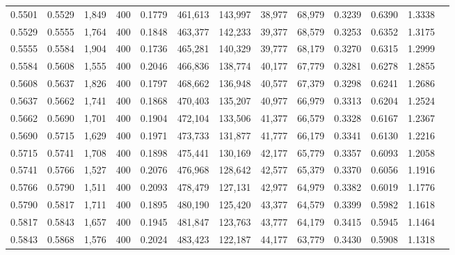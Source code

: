 \begin{tabular}{rrrrrrrrrrrrr}
0.5501 & 0.5529 &  1,849 &   400 &                                     0.1779 & 461,613 & 143,997 &  38,977 &  68,979 & 0.3239 & 0.6390 & 1.3338 \\
0.5529 & 0.5555 &  1,764 &   400 &                                     0.1848 & 463,377 & 142,233 &  39,377 &  68,579 & 0.3253 & 0.6352 & 1.3175 \\
0.5555 & 0.5584 &  1,904 &   400 &                                     0.1736 & 465,281 & 140,329 &  39,777 &  68,179 & 0.3270 & 0.6315 & 1.2999 \\
0.5584 & 0.5608 &  1,555 &   400 &                                     0.2046 & 466,836 & 138,774 &  40,177 &  67,779 & 0.3281 & 0.6278 & 1.2855 \\
0.5608 & 0.5637 &  1,826 &   400 &                                     0.1797 & 468,662 & 136,948 &  40,577 &  67,379 & 0.3298 & 0.6241 & 1.2686 \\
0.5637 & 0.5662 &  1,741 &   400 &                                     0.1868 & 470,403 & 135,207 &  40,977 &  66,979 & 0.3313 & 0.6204 & 1.2524 \\
0.5662 & 0.5690 &  1,701 &   400 &                                     0.1904 & 472,104 & 133,506 &  41,377 &  66,579 & 0.3328 & 0.6167 & 1.2367 \\
0.5690 & 0.5715 &  1,629 &   400 &                                     0.1971 & 473,733 & 131,877 &  41,777 &  66,179 & 0.3341 & 0.6130 & 1.2216 \\
0.5715 & 0.5741 &  1,708 &   400 &                                     0.1898 & 475,441 & 130,169 &  42,177 &  65,779 & 0.3357 & 0.6093 & 1.2058 \\
0.5741 & 0.5766 &  1,527 &   400 &                                     0.2076 & 476,968 & 128,642 &  42,577 &  65,379 & 0.3370 & 0.6056 & 1.1916 \\
0.5766 & 0.5790 &  1,511 &   400 &                                     0.2093 & 478,479 & 127,131 &  42,977 &  64,979 & 0.3382 & 0.6019 & 1.1776 \\
0.5790 & 0.5817 &  1,711 &   400 &                                     0.1895 & 480,190 & 125,420 &  43,377 &  64,579 & 0.3399 & 0.5982 & 1.1618 \\
0.5817 & 0.5843 &  1,657 &   400 &                                     0.1945 & 481,847 & 123,763 &  43,777 &  64,179 & 0.3415 & 0.5945 & 1.1464 \\
0.5843 & 0.5868 &  1,576 &   400 &                                     0.2024 & 483,423 & 122,187 &  44,177 &  63,779 & 0.3430 & 0.5908 & 1.1318 \\

\end{tabular}
